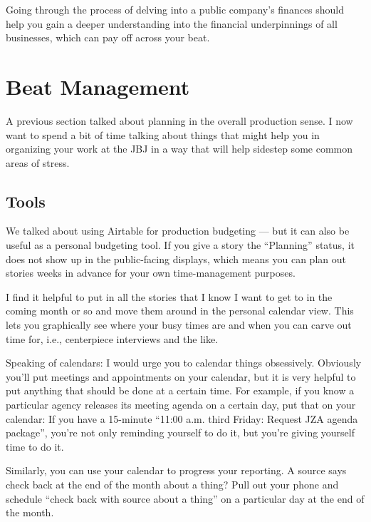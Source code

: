 \documentclass[
  11pt,
  american,
  letterpaperpaper,
  extrafontsizes,onecolumn,openright
  ]{memoir}
\begin{document}
Going through the process of delving into a public company's finances should help you gain a deeper understanding into the financial underpinnings of all businesses, which can pay off across your beat.

\hypertarget{beat-management}{%
\chapter{Beat Management}\label{beat-management}}

A previous section talked about planning in the overall production sense. I now want to spend a bit of time talking about things that might help you in organizing your work at the JBJ in a way that will help sidestep some common areas of stress.

\hypertarget{tools}{%
\section*{Tools}\label{tools}}

We talked about using Airtable for production budgeting --- but it can also be useful as a personal budgeting tool. If you give a story the \enquote{Planning} status, it does not show up in the public-facing displays, which means you can plan out stories weeks in advance for your own time-management purposes.

I find it helpful to put in all the stories that I know I want to get to in the coming month or so and move them around in the personal calendar view. This lets you graphically see where your busy times are and when you can carve out time for, i.e., centerpiece interviews and the like.

Speaking of calendars: I would urge you to calendar things obsessively. Obviously you'll put meetings and appointments on your calendar, but it is very helpful to put anything that should be done at a certain time. For example, if you know a particular agency releases its meeting agenda on a certain day, put that on your calendar: If you have a 15-minute \enquote{11:00 a.m. third Friday: Request JZA agenda package}, you're not only reminding yourself to do it, but you're giving yourself time to do it.

Similarly, you can use your calendar to progress your reporting. A source says check back at the end of the month about a thing? Pull out your phone and schedule \enquote{check back with source about a thing} on a particular day at the end of the month.
\end{document}
